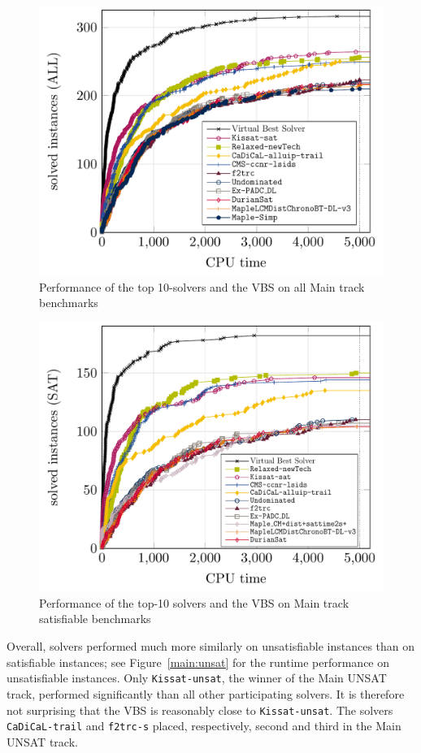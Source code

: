 \documentclass{elsarticle}
\newcommand{\solver}[1]{\texttt{#1}}
\begin{document}
\begin{figure}[ht]
\centering
\includegraphics[width=.9\textwidth]{img/paper-main-top10-ALL.pdf}
\caption{Performance of the top 10-solvers and the VBS on all  Main track benchmarks}
\label{main:all}
\end{figure}



\begin{figure}[ht]
\centering
\includegraphics[width=.9\textwidth]{img/paper-main-top10-SAT.pdf}
\caption{Performance of the top-10 solvers and the VBS on Main track satisfiable benchmarks}
\label{main:sat}
\end{figure}


Overall, solvers performed much more similarly on
unsatisfiable instances than on satisfiable instances;
see Figure~\ref{main:unsat} for the runtime performance on unsatisfiable instances. 
Only \solver{Kissat-unsat}, the winner of the Main UNSAT track, 
performed significantly than all other participating solvers. 
It is therefore not surprising
that the VBS is reasonably close to \solver{Kissat-unsat}. %
The solvers \solver{CaDiCaL-trail}
and \solver{f2trc-s} placed, respectively, second and third in the Main UNSAT track.
\end{document}
